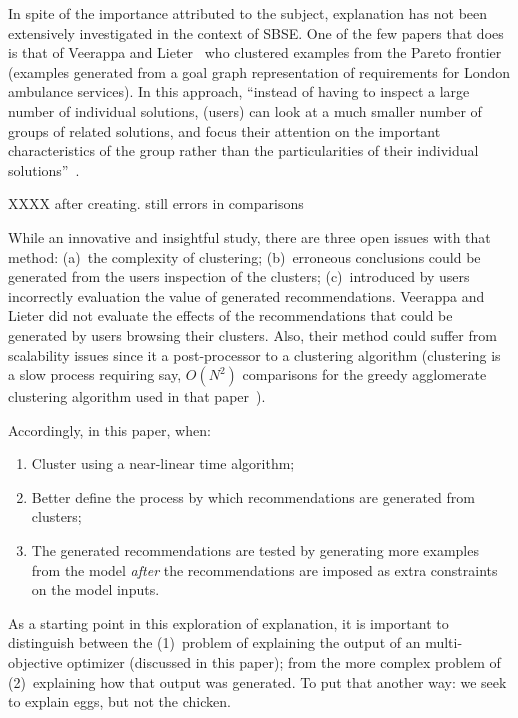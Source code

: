 \documentclass[runningheads]{llncs}
\newcommand{\be}{\begin{enumerate}}
\newcommand{\ee}{\end{enumerate}}
\begin{document}
In spite of the importance attributed to the subject,
explanation has not been extensively investigated in the context of SBSE.
One of the few papers that does is that of 
 Veerappa and Lieter~\cite{veerappa11} who
clustered examples from the Pareto
frontier (examples generated from a goal graph representation of requirements
for London ambulance services). In this approach,
``instead of having to inspect a large
number of individual solutions, (users) can look at a
much smaller number of groups of related solutions,
and focus their attention on the important
characteristics of the group rather than the
particularities of their individual solutions''~\cite{veerappa11}. 

XXXX after creating. still errors in comparisons

While an innovative and insightful study, there
are three open issues with that method:  (a)~the complexity
of clustering; (b)~erroneous conclusions could be generated from the users 
inspection of the clusters; (c)~introduced by users
incorrectly evaluation the value of generated recommendations.
 Veerappa and Lieter did not evaluate the effects
of the recommendations that could be generated by users browsing their
clusters. 
Also, their method could suffer from scalability issues since it
a post-processor
to a clustering algorithm (clustering is a slow process  requiring
 say, $O(N^2)$ comparisons
for the greedy agglomerate clustering algorithm used in that paper~\cite{koc11b}).

Accordingly, in this paper, when:
\be
\item Cluster using a near-linear time algorithm;
\item Better define the process by which recommendations are generated
      from clusters;
\item The generated recommendations are tested by generating more
examples from the model {\em after} the recommendations are imposed
as extra constraints on the model inputs.
\ee
As a starting point in this exploration of explanation,
it is important to distinguish between the
(1)~problem of explaining the output of an
multi-objective optimizer (discussed in this paper);
from the more complex problem of (2)~explaining how
that output was generated.  To put that another way:
we seek to explain eggs, but not
the chicken.
\end{document}
